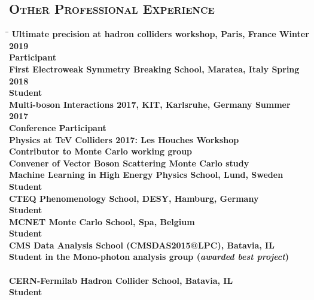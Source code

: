 \documentclass[10pt]{res} %
\begin{document}
\begin{resume}

\section{\textsc{Other Professional Experience}}
\vspace{-0.1in}
\begin{tabbing}
\hspace{2.3in}\= \hspace{2.6in}\= \kill %
\bf{Ultimate precision at hadron colliders workshop, Paris, France}	\>\> Winter 2019 	\\
  Participant \\
\bf{First Electroweak Symmetry Breaking School, Maratea, Italy}	\>\> Spring 2018 	\\
  Student \\
\bf{Multi-boson Interactions 2017, KIT, Karlsruhe, Germany}	\>\> Summer 2017 	\\
  Conference Participant \\
\bf{Physics at TeV Colliders 2017: Les Houches Workshop}	\>	\\
  Contributor to Monte Carlo working group \\
  Convener of Vector Boson Scattering Monte Carlo study \\
\bf{Machine Learning in High Energy Physics School, Lund, Sweden}	\>	\\
  Student \\
\bf{CTEQ Phenomenology School, DESY, Hamburg, Germany}	\>	\\
  Student \\
\bf{MCNET Monte Carlo School, Spa, Belgium}	\>	\\
  Student \\
\bf{CMS Data Analysis School (CMSDAS2015@LPC), Batavia, IL}	\>\\
  Student in the Mono-photon analysis group (\emph{awarded best project}) 	\\
\\
\bf{CERN-Fermilab Hadron Collider School, Batavia, IL}		\>\>{Summer 2014 }\\
  Student \\
\end{tabbing}\vspace{-20pt}      %

\end{resume}
\end{document}
